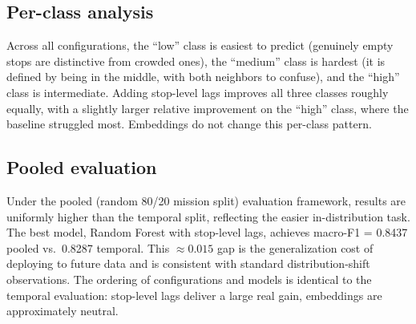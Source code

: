 \subsection{Per-class analysis}

Across all configurations, the ``low'' class is easiest to predict
(genuinely empty stops are distinctive from crowded ones), the ``medium''
class is hardest (it is defined by being in the middle, with both neighbors
to confuse), and the ``high'' class is intermediate. Adding stop-level lags
improves all three classes roughly equally, with a slightly larger relative
improvement on the ``high'' class, where the baseline struggled most.
Embeddings do not change this per-class pattern.

\subsection{Pooled evaluation}
\label{sec:results-pooled}

Under the pooled (random 80/20 mission split) evaluation framework, results
are uniformly higher than the temporal split, reflecting the easier
in-distribution task. The best model, Random Forest with stop-level lags,
achieves macro-F1 = 0.8437 pooled vs.\ 0.8287 temporal. This
$\approx 0.015$ gap is the generalization cost of deploying to future data
and is consistent with standard distribution-shift observations. The
ordering of configurations and models is identical to the temporal
evaluation: stop-level lags deliver a large real gain, embeddings are
approximately neutral.
